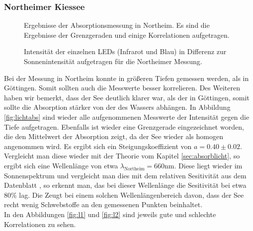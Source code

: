 \documentclass[12pt,a4paper,titlepage,headinclude,bibtotoc]{scrartcl}
\numberwithin{equation}{subsection}
\begin{document}
\subsubsection{Northeimer Kiessee}
\begin{figure}[!h]
	\centering
   \hfill
   \hfill
   \hfill
	\caption{Ergebnisse der Absorptionsmessung in Northeim. Es sind die Ergebnisse der Grenzgeraden und einige Korrelationen aufgetragen.}
	\label{fig:lichtNort}
\end{figure}
\begin{figure}[!htb]
	\centering
	\resizebox{0.7\linewidth}{!}{}
	\caption{Intensität der einzelnen LEDs (Infrarot und Blau) in Differenz zur Sonnenintensität aufgetragen für die Northeimer Messung.}
	\label{fig:led}
\end{figure}
Bei der Messung in Northeim konnte in größeren Tiefen gemessen werden, als in Göttingen.
Somit sollten auch die Messwerte besser korrelieren.
Des Weiteren haben wir bemerkt, dass der See deutlich klarer war, als der in Göttingen, somit sollte die Absorption stärker von der des Wassers abhängen.
In Abbildung \ref{fig:lichtabs} sind wieder alle aufgenommenen Messwerte der Intensität gegen die Tiefe aufgetragen.
Ebenfalls ist wieder eine Grenzgerade eingezeichnet worden, die den Mittelwert der Absorption zeigt, da der See wieder als homogen angenommen wird.
Es ergibt sich ein Steigungskoeffizient von $a=0.40\pm0.02$.
Vergleicht man diese wieder mit der Theorie vom Kapitel \ref{sec:absorblicht}, so ergibt sich eine Wellenlänge von etwa $\lambda_\text{Northeim}=660\si{\nano\meter}$.
Diese liegt wieder im Sonnenspektrum und vergleicht man dies mit dem relativen Sesitivität aus dem Datenblatt \cite[20]{PHOTODatenblatt}, so erkennt man, das bei dieser Wellenlänge die Sesitivität bei etwa 80\% lag.
Die Zeugt bei einem solchen Wellenlängenbereich davon, dass der See recht wenig Schwebstoffe an den gemessenen Punkten beinhaltet.\\
In den Abbildungen \ref{fig:l1} und \ref{fig:l2} sind jeweils gute und schlechte Korrelationen zu sehen.
\end{document}

